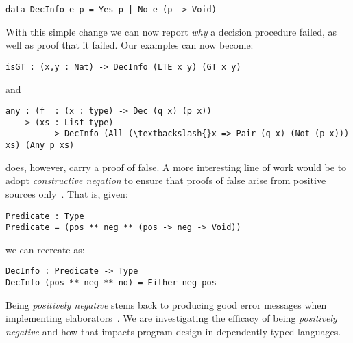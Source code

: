 \begin{Verbatim}
data DecInfo e p = Yes p | No e (p -> Void)
\end{Verbatim}

With this simple change we can now report \emph{why} a decision procedure failed, as well as proof that it failed.
Our examples can now become:

\begin{Verbatim}
isGT : (x,y : Nat) -> DecInfo (LTE x y) (GT x y)
\end{Verbatim}

\noindent
and

\begin{Verbatim}
any : (f  : (x : type) -> Dec (q x) (p x))
   -> (xs : List type)
         -> DecInfo (All (\textbackslash{}x => Pair (q x) (Not (p x))) xs) (Any p xs)
\end{Verbatim}

 does, however, carry a proof of false.
A more interesting line of work would be to adopt \emph{constructive negation} to ensure that proofs of false arise from positive sources only~\cite{msfp/Atkey22}.
That is, given:

\begin{Verbatim}
Predicate : Type
Predicate = (pos ** neg ** (pos -> neg -> Void))
\end{Verbatim}

\noindent
we can recreate  as:

\begin{Verbatim}
DecInfo : Predicate -> Type
DecInfo (pos ** neg ** no) = Either neg pos
\end{Verbatim}

\noindent
Being \emph{positively negative} stems back to producing good error messages when implementing elaborators~\cite{DBLP:journals/jfp/McBrideM04}.
We are investigating the efficacy of being \emph{positively negative} and how that impacts program design in dependently typed languages.

